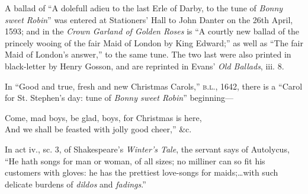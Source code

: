 A ballad of “A dolefull adieu to the last Erle of Darby, to the tune of \textit{Bonny
sweet Robin}” was entered at Stationers’ Hall to John Danter on the 26th April,
1593; and in the \textit{Crown Garland of Golden Roses} is “A courtly new ballad of
the princely wooing of the fair Maid of London by King Edward;” as well as
“The fair Maid of London’s answer,” to the same tune. The two last were also
printed in black-letter by Henry Gosson, and are reprinted in Evans’ \textit{Old
Ballads}, iii. 8.

In “Good and true, fresh and new Christmas Carols,” \textsc{b.l.}, 1642, there is a
“Carol for St. Stephen’s day: tune of \textit{Bonny sweet Robin}” beginning—
\settowidth{\versewidth}{“Come, mad boys, be glad, boys, for Christmas is here,”}
\begin{scverse}
Come, mad boys, be glad, boys, for Christmas is here,\\
And we shall be feasted with jolly good cheer,” \&c.
\end{scverse}

\vspace{-0.5\baselineskip}



\vspace{-1.5\baselineskip}


In act iv., sc. 3, of Shakespeare’s \textit{Winter’s Tale}, the servant says of Autolycus,
“He hath songs for man or woman, of all sizes; no milliner can so fit his
customers with gloves: he has the prettiest love-songs for maids;\ldots with such
delicate burdens of \textit{dildos} and \textit{fadings}.”

